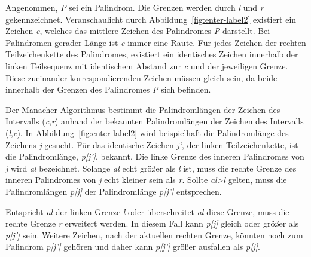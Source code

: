 Angenommen, \textit{P} sei ein Palindrom. Die Grenzen werden durch \textit{l} und \textit{r} gekennzeichnet. Veranschaulicht durch Abbildung~\ref{fig:enter-label2} existiert ein Zeichen \textit{c}, welches das mittlere Zeichen des Palindromes \textit{P} darstellt. Bei Palindromen gerader Länge ist \textit{c} immer eine Raute. Für jedes Zeichen der rechten Teilzeichenkette des Palindromes, existiert ein identisches Zeichen innerhalb der linken Teilsequenz mit identischem Abstand zur \textit{c} und der jeweiligen Grenze. Diese zueinander korrespondierenden Zeichen müssen gleich sein, da beide innerhalb der Grenzen des Palindromes \textit{P} sich befinden. 

Der Manacher-Algorithmus bestimmt die Palindromlängen der Zeichen des Intervalls (\textit{c},\textit{r}) anhand der bekannten Palindromlängen der Zeichen des Intervalls (\textit{l},\textit{c}). In Abbildung~\ref{fig:enter-label2} wird beispielhaft die Palindromlänge des Zeichens \textit{j} gesucht. Für das identische Zeichen \textit{j'}, der linken Teilzeichenkette, ist die Palindromlänge, \textit{p[j’]}, bekannt. Die linke Grenze des inneren Palindromes von \textit{j} wird \textit{al} bezeichnet. Solange \textit{al} echt größer als \textit{l} ist, muss die rechte Grenze des inneren Palindromes von \textit{j} echt kleiner sein als \textit{r}. Sollte \textit{al}>\textit{l} gelten, muss die Palindromlängen \textit{p[j]} der Palindromlänge \textit{p[j’]} entsprechen.

Entspricht \textit{al} der linken Grenze \textit{l} oder überschreitet \textit{al} diese Grenze, muss die rechte Grenze \textit{r} erweitert werden. In diesem Fall kann \textit{p[j]} gleich oder größer als \textit{p[j’]} sein. Weitere Zeichen, nach der aktuellen rechten Grenze, könnten noch zum Palindrom \textit{p[j’]} gehören und daher kann \textit{p[j’]} größer ausfallen als \textit{p[j]}. 

